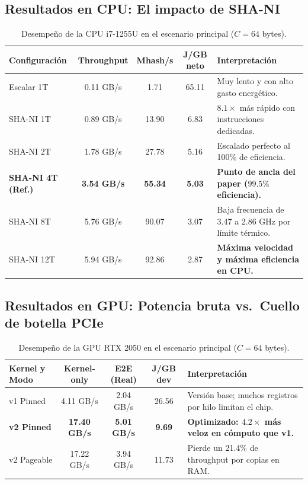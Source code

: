 \documentclass[11pt,a4paper]{article}
\begin{document}
\subsection{Resultados en CPU: El impacto de SHA-NI}
\begin{table}[htbp]
\centering
\begin{tabularx}{\textwidth}{l c c c Y}
\toprule
\textbf{Configuración} & \textbf{Throughput} & \textbf{Mhash/s} & \textbf{J/GB neto} & \textbf{Interpretación} \\
\midrule
Escalar 1T & 0.11 GB/s & 1.71 & 65.11 & Muy lento y con alto gasto energético. \\
SHA-NI 1T  & 0.89 GB/s & 13.90 & 6.83 & $8.1\times$ más rápido con instrucciones dedicadas. \\
SHA-NI 2T  & 1.78 GB/s & 27.78 & 5.16 & Escalado perfecto al 100\% de eficiencia. \\
\textbf{SHA-NI 4T (Ref.)} & \textbf{3.54 GB/s} & \textbf{55.34} & \textbf{5.03} & \textbf{Punto de ancla del paper ($99.5\%$ eficiencia).} \\
SHA-NI 8T  & 5.76 GB/s & 90.07 & 3.07 & Baja frecuencia de 3.47 a 2.86 GHz por límite térmico. \\
SHA-NI 12T & 5.94 GB/s & 92.86 & 2.87 & \textbf{Máxima velocidad y máxima eficiencia en CPU.} \\
\bottomrule
\end{tabularx}
\caption{Desempeño de la CPU i7-1255U en el escenario principal ($C=64$ bytes).}
\end{table}

\subsection{Resultados en GPU: Potencia bruta vs.\ Cuello de botella PCIe}
\begin{table}[htbp]
\centering
\begin{tabularx}{\textwidth}{l c c c Y}
\toprule
\textbf{Kernel y Modo} & \textbf{Kernel-only} & \textbf{E2E (Real)} & \textbf{J/GB dev} & \textbf{Interpretación} \\
\midrule
v1 Pinned   & 4.11 GB/s & 2.04 GB/s & 26.56 & Versión base; muchos registros por hilo limitan el chip. \\
\textbf{v2 Pinned} & \textbf{17.40 GB/s} & \textbf{5.01 GB/s} & \textbf{9.69} & \textbf{Optimizado: $4.2\times$ más veloz en cómputo que v1.} \\
v2 Pageable & 17.22 GB/s & 3.94 GB/s & 11.73 & Pierde un 21.4\% de throughput por copias en RAM. \\
\bottomrule
\end{tabularx}
\caption{Desempeño de la GPU RTX 2050 en el escenario principal ($C=64$ bytes).}
\end{table}
\end{document}
